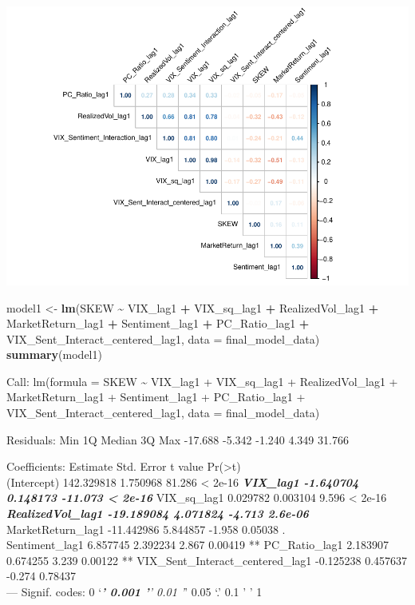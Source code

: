 \documentclass[
]{article}
\newenvironment{Shaded}{\begin{snugshade}}{\end{snugshade}}
\newcommand{\AttributeTok}[1]{\textcolor[rgb]{0.13,0.29,0.53}{#1}}
\newcommand{\FunctionTok}[1]{\textcolor[rgb]{0.13,0.29,0.53}{\textbf{#1}}}
\newcommand{\NormalTok}[1]{#1}
\newcommand{\OtherTok}[1]{\textcolor[rgb]{0.56,0.35,0.01}{#1}}
\newcommand{\SpecialCharTok}[1]{\textcolor[rgb]{0.81,0.36,0.00}{\textbf{#1}}}
\begin{document}
\includegraphics{FinalProject_files/figure-latex/exploratory-data-analysis-3.pdf}

\begin{Shaded}
\begin{Highlighting}[]
\NormalTok{  model1 }\OtherTok{\textless{}{-}} \FunctionTok{lm}\NormalTok{(SKEW }\SpecialCharTok{\textasciitilde{}}\NormalTok{ VIX\_lag1 }\SpecialCharTok{+}\NormalTok{ VIX\_sq\_lag1 }\SpecialCharTok{+}\NormalTok{ RealizedVol\_lag1 }\SpecialCharTok{+} 
\NormalTok{                   MarketReturn\_lag1 }\SpecialCharTok{+}\NormalTok{ Sentiment\_lag1 }\SpecialCharTok{+}\NormalTok{ PC\_Ratio\_lag1 }\SpecialCharTok{+} 
\NormalTok{                   VIX\_Sent\_Interact\_centered\_lag1, }
                 \AttributeTok{data =}\NormalTok{ final\_model\_data)}
  \FunctionTok{summary}\NormalTok{(model1)}
\end{Highlighting}
\end{Shaded}

Call: lm(formula = SKEW \textasciitilde{} VIX\_lag1 + VIX\_sq\_lag1 +
RealizedVol\_lag1 + MarketReturn\_lag1 + Sentiment\_lag1 +
PC\_Ratio\_lag1 + VIX\_Sent\_Interact\_centered\_lag1, data =
final\_model\_data)

Residuals: Min 1Q Median 3Q Max -17.688 -5.342 -1.240 4.349 31.766

Coefficients: Estimate Std. Error t value
Pr(\textgreater\textbar t\textbar)\\
(Intercept) 142.329818 1.750968 81.286 \textless{} 2e-16 \textbf{\emph{
VIX\_lag1 -1.640704 0.148173 -11.073 \textless{} 2e-16 }} VIX\_sq\_lag1
0.029782 0.003104 9.596 \textless{} 2e-16 \textbf{\emph{
RealizedVol\_lag1 -19.189084 4.071824 -4.713 2.6e-06 }}
MarketReturn\_lag1 -11.442986 5.844857 -1.958 0.05038 .\\
Sentiment\_lag1 6.857745 2.392234 2.867 0.00419 ** PC\_Ratio\_lag1
2.183907 0.674255 3.239 0.00122 ** VIX\_Sent\_Interact\_centered\_lag1
-0.125238 0.457637 -0.274 0.78437\\
--- Signif. codes: 0 `\emph{\textbf{' 0.001 '}' 0.01 '}' 0.05 `.' 0.1 '
' 1
\end{document}
